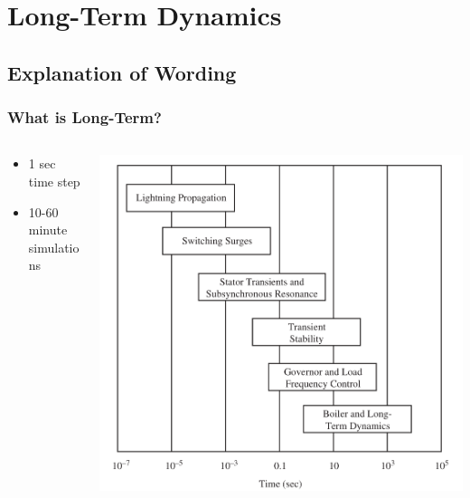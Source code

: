 \documentclass[14pt, unknownkeysallowed]{beamer}
\begin{document}
\section{Long-Term Dynamics}
\subsection{Explanation of Wording}
\begin{frame}
\frametitle{What is Long-Term?}
\begin{columns}
\begin{column}{0.4\textwidth}
   \begin{itemize}
\small
\item 1 sec time step
\item 10-60 minute simulations
\end{itemize}
\end{column}
\begin{column}{0.7\textwidth}
    \begin{center}
     \includegraphics[height=.8\textheight]{timeScales}{\footnotesize\cite{SauerPaiChow}} 
     \end{center}
\end{column}
\end{columns}
\end{frame}
\end{document}
